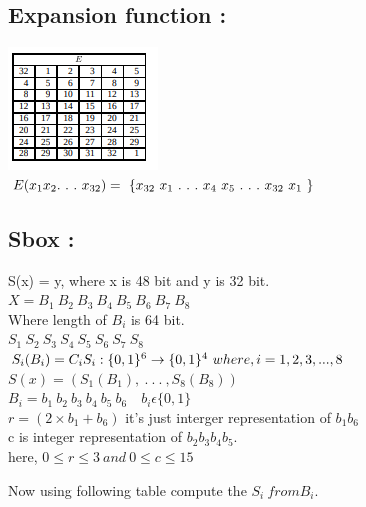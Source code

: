 \documentclass[11pt]{article}
\begin{document}
\newpage
\begin{multicols}{2}
\subsection{Expansion function :}
\includegraphics[scale=1.6]{Images/L_5-6/ExpansionFunction.png}\\   
$E(x_1 x_2 .\ .\ .\ x_{32}) \\ =\ \{ x_{32}\ x_1\ .\ .\ .\ x_4\ x_5\ .\ .\ .\ x_{32}\ x_1\ \}$\\

\columnbreak

\subsection{Sbox :}
S(x) = y, where x is 48 bit and y is 32 bit.\\
$X = B_1\ B_2\ B_3\ B_4\ B_5\ B_6\ B_7\ B_8$\\
Where length of $B_i$ is 64 bit.\\
$S_1\ S_2\ S_3\ S_4\ S_5\ S_6\ S_7\ S_8$\\
$S_i(B_i) = C_i\\
S_i : \{0,1\}^6 \rightarrow \{0,1\}^4 \  where, i=1,2,3,...,8$\\
$S(x) = (S_1(B_1),\ .\ .\ .\ ,S_8(B_8))$\\
$B_i = b_1\ b_2\ b_3\ b_4\ b_5\ b_6 \quad b_i \epsilon \{0,1\}$\\
$r = (2\times b_1 + b_6) $ it's just interger representation of $b_1b_6$\\
c is integer representation of $b_2b_3b_4b_5.$\\
here, $0 \le r \le 3 \ and \ 0 \le c \le 15$

Now using following table compute the $S_i\ from B_i.$\\
\end{multicols}
\end{document}
